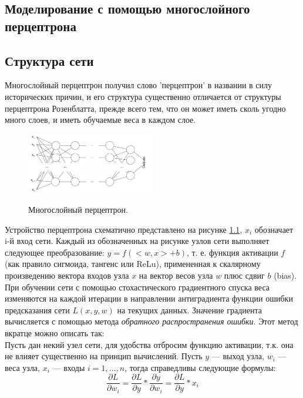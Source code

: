 \documentclass[12pt, oneside]{extbook}
\begin{document}
\begin{flushleft}
\chapter{Моделирование с помощью многослойного перцептрона}
\section{Структура сети}
Многослойный перцептрон получил слово 'перцептрон' в названии в силу исторических причин, и его структура существенно отличается от структуры перцептрона Розенблатта, прежде всего тем, что он может иметь сколь угодно много слоев, и иметь обучаемые веса в каждом слое.
\begin{figure}[h]
\centering
\includegraphics[width=0.5\textwidth]{multi_layer_perceptron_general}
\label{fig:multi_perceptron}
\caption{Многослойный перцептрон.}
\end{figure}
\par
Устройство перцептрона схематично представлено на рисунке \ref{fig:multi_perceptron}, $x_i$ обозначает i-й вход сети. Каждый из обозначенных на рисунке узлов сети выполняет следующее преобразование: $y = f(<w, x> + b)$, т. е. функция активации $f$ (как правило сигмоида, тангенс или ReLu), примененная к скалярному произведению вектора входов узла $x$ на вектор весов узла $w$ плюс сдвиг $b$ (bias). При обучении сети с помощью стохастического градиентного спуска веса изменяются на каждой итерации в направлении антиградиента функции ошибки предсказания сети $L(x, y, w)$ на текущих данных. Значение градиента вычисляется с помощью метода \textit{обратного распространения ошибки}. Этот метод вкратце можно описать так:\\
Пусть дан некий узел сети, для удобства отбросим функцию активации, т.к. она не влияет существенно на принцип вычислений. Пусть $y$ --- выход узла, $w_{i}$ --- веса узла, $x_{i}$ --- входы $i=1,...,n$, тогда справедливы следующие формулы:\\
\begin{equation} \label {eq:2}
\frac{\partial L}{\partial w_{i}} = \frac{\partial L}{\partial y} * \frac{\partial y}{\partial w_{i}} = \frac{\partial L}{\partial y} * x_{i}
\end{equation}\\

\end{flushleft}
\end{document}
